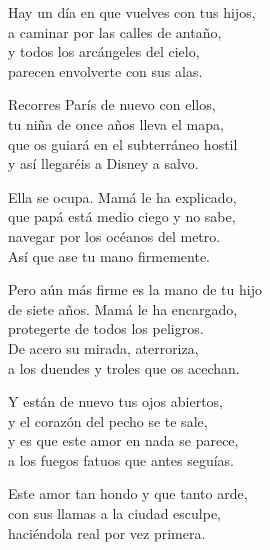 \documentclass[12pt,twoside]{article}
\begin{document}
\begin{poem}
\begin{stanza}
Hay un día en que vuelves con tus hijos,\\
a caminar por las calles de antaño,\\
y todos los arcángeles del cielo,\\
parecen envolverte con sus alas.
\end{stanza}
\begin{stanza}
Recorres París de nuevo con ellos,\\
tu niña de once años lleva el mapa,\\
que os guiará en el subterráneo hostil\\
y así llegaréis a Disney a salvo.
\end{stanza}
\begin{stanza}
Ella se ocupa. Mamá le ha explicado,\\
que papá está medio ciego y no sabe,\\
navegar por los océanos del metro.\\
Así que ase tu mano firmemente.
\end{stanza}
\begin{stanza}
Pero aún más firme es la mano de tu hijo\\
de siete años. Mamá le ha encargado,\\
protegerte de todos los peligros.\\
De acero su mirada, aterroriza,\\
a los duendes y troles que os acechan.
\end{stanza}
\begin{stanza}
Y están de nuevo tus ojos abiertos,\\
y el corazón del pecho se te sale,\\
y es que este amor en nada se parece,\\
a los fuegos fatuos que antes seguías.
\end{stanza}
\begin{stanza}
Este amor tan hondo y que tanto arde,\\
con sus llamas a la ciudad esculpe,\\
haciéndola real por vez primera.
\end{stanza}
\end{poem}
\end{document}

